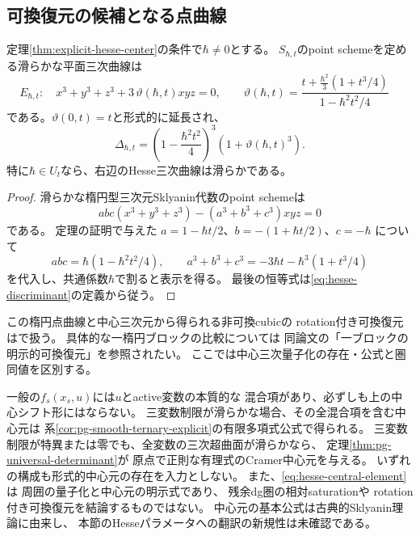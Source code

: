 \subsection{可換復元の候補となる点曲線}
\begin{proposition}[楕円点曲線のHesseパラメータ]
\label{prop:hesse-point-cubic}
定理\ref{thm:explicit-hesse-center}の条件で$\hbar\ne0$とする。
$S_{\hbar,t}$のpoint schemeを定める滑らかな平面三次曲線は
\begin{equation}
 E_{\hbar,t}:\quad
 x^3+y^3+z^3+3\,\vartheta(\hbar,t)xyz=0,
\quad
 \boxed{\quad
 \vartheta(\hbar,t)=
 \frac{t+\frac{\hbar^2}{3}(1+t^3/4)}
 {1-\hbar^2t^2/4}
 \quad}
 \label{eq:hesse-point-parameter}
\end{equation}
である。$\vartheta(0,t)=t$と形式的に延長され、
\begin{equation}
 \Delta_{\hbar,t}
 =\left(1-\frac{\hbar^2t^2}{4}\right)^3
  \left(1+\vartheta(\hbar,t)^3\right).
 \label{eq:hesse-point-delta}
\end{equation}
特に$\hbar\in U_t$なら、右辺のHesse三次曲線は滑らかである。
\end{proposition}
\begin{proof}
滑らかな楕円型三次元Sklyanin代数のpoint schemeは
\begin{equation}
 abc(x^3+y^3+z^3)-(a^3+b^3+c^3)xyz=0
\end{equation}
である\cite{SmithTate,DeLaetLeBruyn}。
定理の証明で与えた
$a=1-\hbar t/2$、$b=-(1+\hbar t/2)$、$c=-\hbar$
について
\begin{equation}
 abc=\hbar(1-\hbar^2t^2/4),\qquad
 a^3+b^3+c^3
 =-3\hbar t-\hbar^3(1+t^3/4)
\end{equation}
を代入し、共通係数$\hbar$で割ると表示を得る。
最後の恒等式は\eqref{eq:hesse-discriminant}の定義から従う。
\end{proof}
\begin{remark}[幾何学的比較との関係]
この楕円点曲線と中心三次元から得られる非可換cubicの
rotation付き可換復元は\cite[一般次元の中心三次非可換変形の可換復元定理]{NCCubicMain}で扱う。
具体的な一楕円ブロックの比較については
同論文の「一ブロックの明示的可換復元」を参照されたい。
ここでは中心三次量子化の存在・公式と圏同値を区別する。
\end{remark}

\begin{remark}[適用範囲と新規性]
\label{rem:hesse-scope}
一般の$f_s(x_s,u)$には$u$とactive変数の本質的な
混合項があり、必ずしも上の中心シフト形にはならない。
三変数制限が滑らかな場合、その全混合項を含む中心元は
系\ref{cor:pg-smooth-ternary-explicit}の有限多項式公式で得られる。
三変数制限が特異または零でも、全変数の三次超曲面が滑らかなら、
定理\ref{thm:pg-universal-determinant}が
原点で正則な有理式のCramer中心元を与える。
いずれの構成も形式的中心元の存在を入力としない。
また、\eqref{eq:hesse-central-element}は
周囲の量子化と中心元の明示式であり、
残余dg圏の相対saturationや
rotation付き可換復元を結論するものではない。
中心元の基本公式は古典的Sklyanin理論に由来し、
本節のHesseパラメータへの翻訳の新規性は未確認である。
\end{remark}
